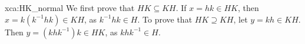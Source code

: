 \begin{sol}{xca:HK_normal}
We first prove that
$HK\subseteq KH$. If $x=hk\in HK$, then
 $x=k(k^{-1}hk)\in KH$, as $k^{-1}hk\in H$. To prove 
that $HK\supseteq KH$, let $y=kh\in KH$. Then $y=(khk^{-1})k\in HK$, as  $khk^{-1}\in H$. 
\end{sol}


